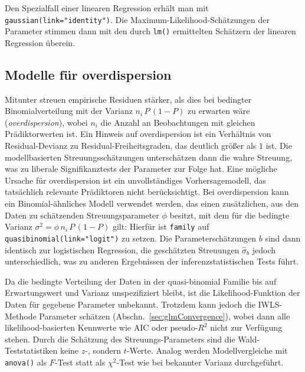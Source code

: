 Den Spezialfall einer linearen Regression erhält man mit \lstinline!gaussian(link="identity")!. Die Maximum-Likelihood-Schätzungen der Parameter stimmen dann mit den durch \lstinline!lm()! ermittelten Schätzern der linearen Regression überein.

\subsection{Modelle für overdispersion}
\label{sec:glmOverdispersion}

Mitunter streuen empirische Residuen stärker, als dies bei bedingter Binomialverteilung mit der Varianz $n_{i} \, P \, (1-P)$ zu erwarten wäre (\emph{overdispersion}), wobei $n_{i}$ die Anzahl an Beobachtungen mit gleichen Prädiktorwerten ist. Ein Hinweis auf overdispersion ist ein Verhältnis von Residual-Devianz zu Residual-Freiheitsgraden, das deutlich größer als $1$ ist. Die modellbasierten Streuungsschätzungen unterschätzen dann die wahre Streuung, was zu liberale Signifikanztests der Parameter zur Folge hat. Eine mögliche Ursache für overdispersion ist ein unvollständiges Vorhersagemodell, das tatsächlich relevante Prädiktoren nicht berücksichtigt. Bei overdispersion kann ein Binomial-ähnliches Modell verwendet werden, das einen zusätzlichen, aus den Daten zu schätzenden Streuungsparameter $\phi$ besitzt, mit dem für die bedingte Varianz $\sigma^{2} = \phi \, n_{i} \, P \, (1-P)$ gilt: Hierfür ist \lstinline!family! auf \lstinline!quasibinomial(link="logit")! zu setzen. Die Parameterschätzungen $b$ sind dann identisch zur logistischen Regression, die geschätzten Streuungen $\hat{\sigma}_{b}$ jedoch unterschiedlich, was zu anderen Ergebnissen der inferenzstatistischen Tests führt.

Da die bedingte Verteilung der Daten in der quasi-binomial Familie bis auf Erwartungswert und Varianz unspezifiziert bleibt, ist die Likelihood-Funktion der Daten für gegebene Parameter unbekannt. Trotzdem kann jedoch die IWLS-Methode Parameter schätzen (Abschn.\ \ref{sec:glmConvergence}), wobei dann alle likelihood-basierten Kennwerte wie AIC oder pseudo-$R^{2}$ nicht zur Verfügung stehen. Durch die Schätzung des Streuungs-Parameters sind die Wald-Teststatistiken keine $z$-, sondern $t$-Werte. Analog werden Modellvergleiche mit \lstinline!anova()! als $F$-Test statt als $\chi^{2}$-Test wie bei bekannter Varianz durchgeführt.

